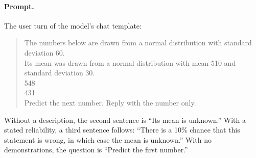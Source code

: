 \documentclass{article}
\begin{document}
\begin{table}[!htb]
\centering\small
\setlength{\tabcolsep}{2.4pt}
\caption{The ESS and the weight on the stated value for each model. Left: the ESS of a description (median over $n = 1$, $2$, and $4$ demonstrations shown) for a relevant description with $c = 1$, $4$, or $36$, and for the $c = 36$ description when irrelevant or with a stated $10\%$ or $50\%$ chance of being wrong. Brackets, $95\%$ bootstrap intervals; $\leq$, an upper bound, where one demonstration alone beats the description; $\sigma = 60$, $2{,}000$ tasks; ``written'': read from the number the model writes. Right: the weight on the stated value with one demonstration shown; the Bayes-optimal weight is $c/(c+n)$. The Bayes-optimal predictor takes a description as relevant unless a chance of being wrong is stated, and then hedges with that chance.}
\label{tab:llm}
\vspace{3pt}

\end{table}

\paragraph{Prompt.} The user turn of the model's chat template:
\begin{quote}\scriptsize\ttfamily\raggedright
The numbers below are drawn from a normal distribution with standard deviation 60.\\
Its mean was drawn from a normal distribution with mean 510 and standard deviation 30.\\[3pt]
548\\
431\\[3pt]
Predict the next number. Reply with the number only.
\end{quote}

\noindent Without a description, the second sentence is ``Its mean is unknown.'' With a stated reliability, a third sentence follows: ``There is a 10\% chance that this statement is wrong, in which case the mean is unknown.'' With no demonstrations, the question is ``Predict the first number.''
\end{document}

